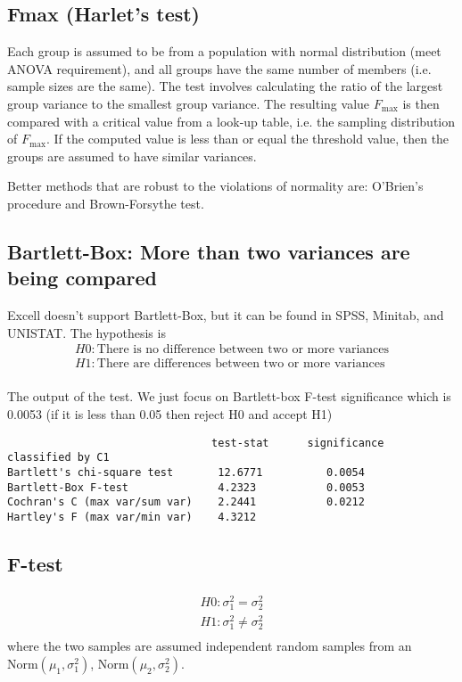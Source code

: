 \subsection{Fmax (Harlet's test)}

Each group is assumed to be from a population with normal distribution (meet
ANOVA requirement), and all groups have the same number of members (i.e. sample
sizes are the same). The test involves calculating the ratio of the largest
group variance to the smallest group variance. The resulting value $F_\max$ is
then compared with a critical value from a look-up table, i.e. the sampling
distribution of $F_\max$.
If the computed value is less than or equal the threshold value, then the groups
are assumed to have similar variances. 

Better methods that are robust to the violations of normality are: O'Brien's
procedure and Brown-Forsythe test.

\subsection{Bartlett-Box: More than two variances are being compared}
\label{sec:Bartlett-Box_test}

Excell doesn't support Bartlett-Box, but it can be found in SPSS, Minitab, and
UNISTAT. The hypothesis is
\begin{eqnarray*}
  H0: \text{There is no difference between two or more variances}\\
  H1: \text{There are differences between two or more variances}\\
\end{eqnarray*}

The output of the test. We just focus on Bartlett-box F-test significance which
is 0.0053 (if it is less than 0.05 then reject H0 and accept H1)
\begin{verbatim}
                                test-stat      significance
classified by C1
Bartlett's chi-square test       12.6771          0.0054
Bartlett-Box F-test              4.2323           0.0053
Cochran's C (max var/sum var)    2.2441           0.0212
Hartley's F (max var/min var)    4.3212
\end{verbatim}

\subsection{F-test}

\begin{eqnarray*}
  H0: \sigma_1^2 = \sigma_2^2 \\
  H1: \sigma_1^2 \ne \sigma_2^2 \\
\end{eqnarray*}
where the two samples are assumed independent random samples from an
$\text{Norm}(\mu_1, \sigma_1^2)$, $\text{Norm}(\mu_2, \sigma_2^2)$.

